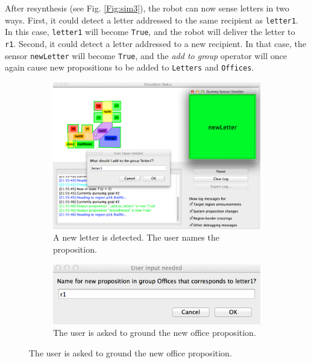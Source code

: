 After resynthesis (see Fig. \ref{Fig:sim3}), the robot can now sense letters in two ways. First, it could detect a letter addressed to the same recipient as \texttt{letter1}. In this case, \texttt{letter1} will become \texttt{True}, and the robot will deliver the letter to \texttt{r1}. Second, it could detect a letter addressed to a new recipient. In that case, the sensor \texttt{newLetter} will become \texttt{True}, and the \emph{add to group} operator will once again cause new propositions to be added to \texttt{Letters} and \texttt{Offices}.

\begin{figure}[h]
	\centering
	\begin{subfigure}[b]{0.99\columnwidth}
	\includegraphics[width=0.99\columnwidth, clip]{./img/sim1.jpg}
	\caption{A new letter is detected. The user names the proposition.} 
	\label{Fig:sim1}
	\end{subfigure}
	
	\begin{subfigure}[b]{0.99\columnwidth}
	\includegraphics[width=0.99\columnwidth, clip]{./img/sim2.jpg}
	\caption{The user is asked to ground the new office proposition.} 
	\label{Fig:sim2}
	\end{subfigure}
	

\end{figure}
